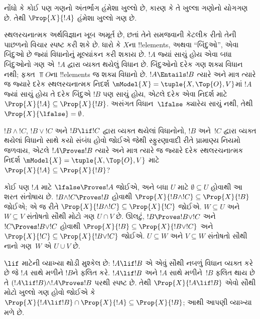 \documentclass[../../../include/open-logic-section]{subfiles}
\begin{document}
નોંધો કે કોઈ પણ ગણનો અંતર્ભાગ હંમેશા ખુલ્લો છે, કારણ કે
તે ખુલ્લા ગણોનો યોગગણ છે. તેથી $\Prop{X}{!A}$ હંમેશા
ખુલ્લો ગણ છે.

સ્થલરચનાત્મક અર્થવિજ્ઞાન ખૂબ અમૂર્ત છે, છતાં તેને સમજવાની
કેટલીક રીતો તેની પાછળનો વિચાર સ્પષ્ટ કરી શકે છે. ધારો કે
$X$ના !!{element}s, અથવા ``બિંદુઓ'', એવા બિંદુઓ છે જ્યાં
વિધાનોનું મૂલ્યાંકન કરી શકાય છે. $!A$ જ્યાં સાચું હોય એવા
બધા બિંદુઓનો ગણ એ~$!A$ દ્વારા વ્યક્ત થયેલું વિધાન છે.
બિંદુઓનો દરેક ગણ શક્ય વિધાન નથી; ફક્ત $\Top{O}$ના
!!{element}s જ શક્ય વિધાનો છે. $!A \Entails !B$
ત્યારે અને માત્ર ત્યારે જ જ્યારે દરેક સ્થલરચનાત્મક નિદર્શ
$\mModel{X}=\tuple{X,\Top{O},V}$માં $!A$ જ્યાં સાચું હોય તે
દરેક બિંદુએ $!B$ પણ સાચું હોય, એટલે દરેક એવા નિદર્શ માટે
$\Prop{X}{!A} \subseteq \Prop{X}{!B}$. અસંગત વિધાન~$\lfalse$ ક્યારેય
સાચું નથી, તેથી $\Prop{X}{\lfalse} = \emptyset$.

$!B \land !C$, $!B \lor !C$ અને $!B \lif !C$ દ્વારા
વ્યક્ત થયેલાં વિધાનોનો, $!B$ અને~$!C$ દ્વારા વ્યક્ત થયેલાં
વિધાનો સાથે કયો સંબંધ હોવો જોઈએ જેથી સ્ફુરણાવાદી રીતે
પ્રામાણ્ય નિયમો જળવાય, એટલે $!A \Proves !B$ ત્યારે અને માત્ર
ત્યારે જ જ્યારે દરેક સ્થલરચનાત્મક નિદર્શ
$\mModel{X}=\tuple{X,\Top{O},V}$ માટે
$\Prop{X}{!A} \subseteq \Prop{X}{!B}$?


કોઈ પણ $!A$ માટે $\lfalse \Proves !A$ જોઈએ, અને બધા
$U$ માટે $\emptyset \subseteq U$ હોવાથી આ શરત સંતોષાય
છે. $!B \land !C \Proves !B$ હોવાથી
$\Prop{X}{!B \land !C} \subseteq \Prop{X}{!B}$ જોઈએ;
એ જ રીતે $\Prop{X}{!B \land !C} \subseteq \Prop{X}{!C}$
જોઈએ. $W \subseteq U$ અને $W \subseteq V$ સંતોષતો સૌથી
મોટો ગણ $U \cap V$ છે. ઊલટું, $!B \Proves !B \lor !C$
અને $!C \Proves !B \lor !C$ હોવાથી
$\Prop{X}{!B} \subseteq \Prop{X}{!B \lor !C}$ અને
$\Prop{X}{!C} \subseteq \Prop{X}{!B \lor !C}$ જોઈએ.
$U \subseteq W$ અને $V \subseteq W$ સંતોષતો સૌથી નાનો
ગણ~$W$ એ $U \cup V$ છે.

$\lif$ માટેની વ્યાખ્યા થોડી મુશ્કેલ છે: $!A \lif !B$ એ
એવું સૌથી નબળું વિધાન વ્યક્ત કરે છે જે $!A$ સાથે મળીને
$!B$ને ફલિત કરે. $!A \lif !B$ અને $!A$ સાથે મળીને~$!B$
ફલિત થાય છે તે $(!A \lif !B) \land !A \Proves !B $
પરથી સ્પષ્ટ છે. તેથી $\Prop{X}{!A \lif !B}$ એવો સૌથી મોટો
ખુલ્લો ગણ હોવો જોઈએ કે $\Prop{X}{!A \lif !B} \cap \Prop{X}{!A}
\subseteq \Prop{X}{!B}$; આથી આપણી વ્યાખ્યા મળે છે.
\end{document}
